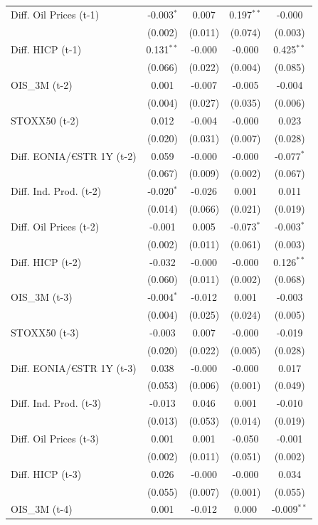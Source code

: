 \begin{longtable}[t]{lcccc}
Diff. Oil Prices (t-1) & -0.003$^{*}$ & 0.007 & 0.197$^{**}$ & -0.000\\
 & (0.002) & (0.011) & (0.074) & (0.003)\\
Diff. HICP (t-1) & 0.131$^{**}$ & -0.000 & -0.000 & 0.425$^{**}$\\
 & (0.066) & (0.022) & (0.004) & (0.085)\\
OIS\_3M (t-2) & 0.001 & -0.007 & -0.005 & -0.004\\
 & (0.004) & (0.027) & (0.035) & (0.006)\\
STOXX50 (t-2) & 0.012 & -0.004 & -0.000 & 0.023\\
 & (0.020) & (0.031) & (0.007) & (0.028)\\
Diff. EONIA/€STR 1Y (t-2) & 0.059 & -0.000 & -0.000 & -0.077$^{*}$\\
 & (0.067) & (0.009) & (0.002) & (0.067)\\
Diff. Ind. Prod. (t-2) & -0.020$^{*}$ & -0.026 & 0.001 & 0.011\\
 & (0.014) & (0.066) & (0.021) & (0.019)\\
Diff. Oil Prices (t-2) & -0.001 & 0.005 & -0.073$^{*}$ & -0.003$^{*}$\\
 & (0.002) & (0.011) & (0.061) & (0.003)\\
Diff. HICP (t-2) & -0.032 & -0.000 & -0.000 & 0.126$^{**}$\\
 & (0.060) & (0.011) & (0.002) & (0.068)\\
OIS\_3M (t-3) & -0.004$^{*}$ & -0.012 & 0.001 & -0.003\\
 & (0.004) & (0.025) & (0.024) & (0.005)\\
STOXX50 (t-3) & -0.003 & 0.007 & -0.000 & -0.019\\
 & (0.020) & (0.022) & (0.005) & (0.028)\\
Diff. EONIA/€STR 1Y (t-3) & 0.038 & -0.000 & -0.000 & 0.017\\
 & (0.053) & (0.006) & (0.001) & (0.049)\\
Diff. Ind. Prod. (t-3) & -0.013 & 0.046 & 0.001 & -0.010\\
 & (0.013) & (0.053) & (0.014) & (0.019)\\
Diff. Oil Prices (t-3) & 0.001 & 0.001 & -0.050 & -0.001\\
 & (0.002) & (0.011) & (0.051) & (0.002)\\
Diff. HICP (t-3) & 0.026 & -0.000 & -0.000 & 0.034\\
 & (0.055) & (0.007) & (0.001) & (0.055)\\
OIS\_3M (t-4) & 0.001 & -0.012 & 0.000 & -0.009$^{**}$\\

\end{longtable}
